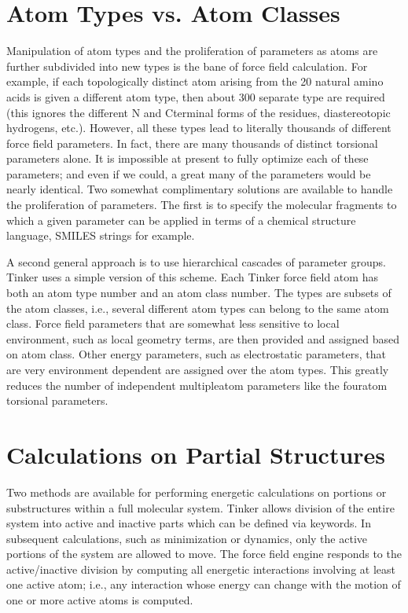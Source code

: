 \documentclass[letterpaper,11pt,english]{sphinxmanual}
\begin{document}
\section{Atom Types vs. Atom Classes}
\label{\detokenize{text/special-features:atom-types-vs-atom-classes}}
Manipulation of atom types and the proliferation of parameters as atoms are further subdivided into new types is the bane of force field calculation. For example, if each topologically distinct atom arising from the 20 natural amino acids is given a different atom type, then about 300 separate type are required (this ignores the different N\sphinxhyphen{} and C\sphinxhyphen{}terminal forms of the residues, diastereotopic hydrogens, etc.). However, all these types lead to literally thousands of different force field parameters. In fact, there are many thousands of distinct torsional parameters alone. It is impossible at present to fully optimize each of these parameters; and even if we could, a great many of the parameters would be nearly identical. Two somewhat complimentary solutions are available to handle the proliferation of parameters. The first is to specify the molecular fragments to which a given parameter can be applied in terms of a chemical structure language, SMILES strings for example.

A second general approach is to use hierarchical cascades of parameter groups. Tinker uses a simple version of this scheme. Each Tinker force field atom has both an atom type number and an atom class number. The types are subsets of the atom classes, i.e., several different atom types can belong to the same atom class. Force field parameters that are somewhat less sensitive to local environment, such as local geometry terms, are then provided and assigned based on atom class. Other energy parameters, such as electrostatic parameters, that are very environment dependent are assigned over the atom types. This greatly reduces the number of independent multiple\sphinxhyphen{}atom parameters like the four\sphinxhyphen{}atom torsional parameters.


\section{Calculations on Partial Structures}
\label{\detokenize{text/special-features:calculations-on-partial-structures}}
Two methods are available for performing energetic calculations on portions or substructures within a full molecular system. Tinker allows division of the entire system into active and inactive parts which can be defined via keywords. In subsequent calculations, such as minimization or dynamics, only the active portions of the system are allowed to move. The force field engine responds to the active/inactive division by computing all energetic interactions involving at least one active atom; i.e., any interaction whose energy can change with the motion of one or more active atoms is computed.
\end{document}

